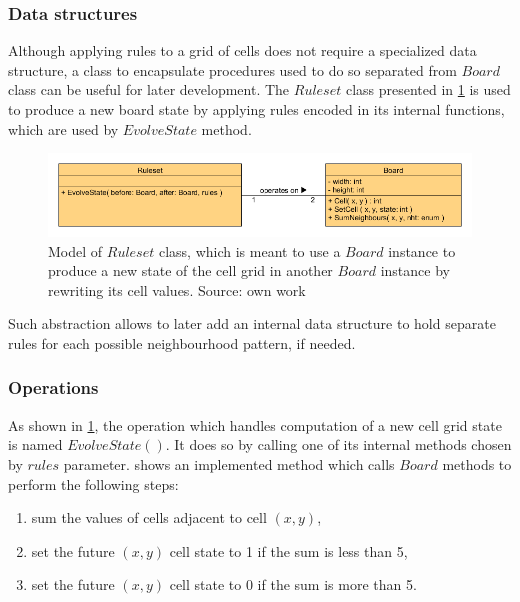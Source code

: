 \documentclass[12pt]{report}
\begin{document}
\subsubsection{Data structures}

Although applying rules to a grid of cells does not require a specialized data structure, a class to encapsulate procedures used to do so separated from $Board$ class can be useful for later development. The $Ruleset$ class presented in \cref{fig:ruleset-board} is used to produce a new board state by applying rules encoded in its internal functions, which are used by $EvolveState$ method.

\begin{figure}[h]
	\centering
	\includegraphics[width=0.9\linewidth]{diagrams/ruleset-board}
	\caption{Model of $Ruleset$ class, which is meant to use a $Board$ instance to produce a new state of the cell grid in another $Board$ instance by rewriting its cell values. Source: own work}
	\label{fig:ruleset-board}
\end{figure}

Such abstraction allows to later add an internal data structure to hold separate rules for each possible neighbourhood pattern, if needed. 

\subsubsection{Operations}

As shown in \cref{fig:ruleset-board}, the operation which handles computation of a new cell grid state is named $EvolveState()$. It does so by calling one of its internal methods chosen by $rules$ parameter.  shows an implemented method which calls $Board$ methods to perform the following steps:

\begin{enumerate}
	\item sum the values of cells adjacent to cell $(x,y)$,
	\item set the future $(x,y)$ cell state to 1 if the sum is less than 5,
	\item set the future $(x,y)$ cell state to 0 if the sum is more than 5.
\end{enumerate}
\end{document}
